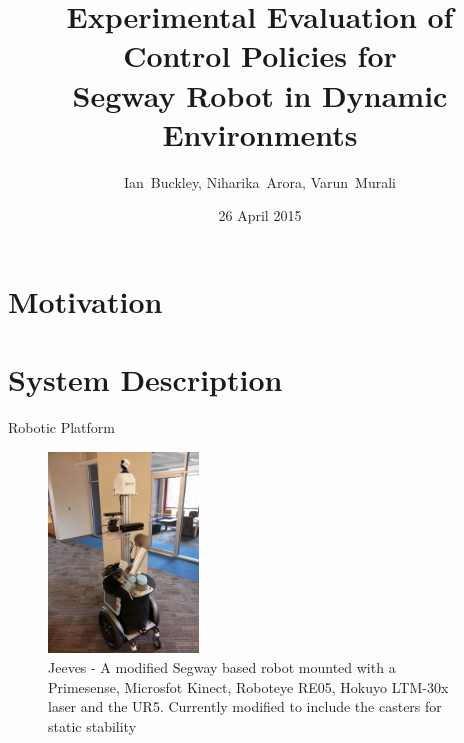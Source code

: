 \documentclass[10pt]{beamer}
\title{Experimental Evaluation of Control Policies for \\Segway Robot in Dynamic Environments }
\author{Ian~Buckley, Niharika~Arora, Varun~Murali}
\date{26 April 2015}
\institute{ECE 6552: Nonlinear System Project}
\begin{document}
\maketitle
\section{Motivation}
\begin{frame}

\end{frame}

\section{System Description}
\begin{frame}{Robotic Platform}
\begin{figure}
    \centering
    \includegraphics[width = 4cm, scale=0.2]{jeeves2_0.jpg}
    \caption{Jeeves - A modified Segway based robot mounted with a Primesense, Microsfot Kinect, Roboteye RE05, Hokuyo LTM-30x laser and the UR5. Currently modified to include the casters for static stability
    \label{fig:jeeves}}
\end{figure}
\end{frame}
\end{document}
